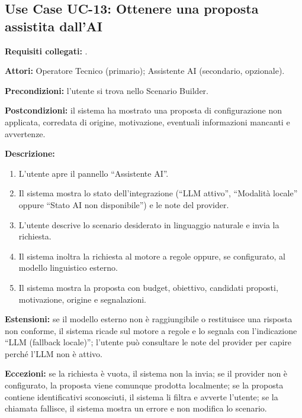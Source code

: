 \subsection*{Use Case UC-13: Ottenere una proposta assistita dall'AI}
\textbf{Requisiti collegati:} .\par
\textbf{Attori:} Operatore Tecnico (primario); Assistente AI (secondario, opzionale).\par
\textbf{Precondizioni:} l'utente si trova nello Scenario Builder.\par
\textbf{Postcondizioni:} il sistema ha mostrato una proposta di configurazione non applicata, corredata di origine, motivazione, eventuali informazioni mancanti e avvertenze.\par
\textbf{Descrizione:}
\begin{enumerate}[leftmargin=1.6em, itemsep=0.1em]
    \item L'utente apre il pannello ``Assistente AI''.
    \item Il sistema mostra lo stato dell'integrazione (``LLM attivo'', ``Modalità locale'' oppure ``Stato AI non disponibile'') e le note del provider.
    \item L'utente descrive lo scenario desiderato in linguaggio naturale e invia la richiesta.
    \item Il sistema inoltra la richiesta al motore a regole oppure, se configurato, al modello linguistico esterno.
    \item Il sistema mostra la proposta con budget, obiettivo, candidati proposti, motivazione, origine e segnalazioni.
\end{enumerate}
\textbf{Estensioni:} se il modello esterno non è raggiungibile o restituisce una risposta non conforme, il sistema ricade sul motore a regole e lo segnala con l'indicazione ``LLM (fallback locale)''; l'utente può consultare le note del provider per capire perché l'LLM non è attivo.\par
\textbf{Eccezioni:} se la richiesta è vuota, il sistema non la invia; se il provider non è configurato, la proposta viene comunque prodotta localmente; se la proposta contiene identificativi sconosciuti, il sistema li filtra e avverte l'utente; se la chiamata fallisce, il sistema mostra un errore e non modifica lo scenario.

